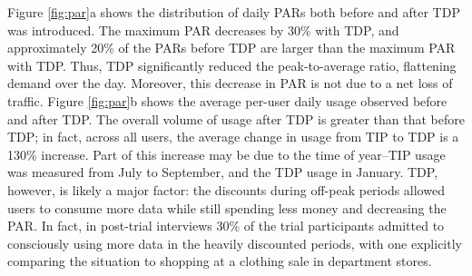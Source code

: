Figure \ref{fig:par}a shows the distribution of daily PARs both before and after TDP was introduced.  The maximum PAR decreases by 30\% with TDP, and approximately 20\% of the PARs before TDP are larger than the maximum PAR with TDP.  Thus, TDP significantly reduced the peak-to-average ratio, flattening demand over the day. Moreover, this decrease in PAR is not due to a net loss of traffic.  Figure \ref{fig:par}b shows the average per-user daily usage observed before and after TDP.  The overall volume of usage after TDP is greater than that before TDP; in fact, across all users, the average change in usage from TIP to TDP is a 130\% increase.  Part of this increase may be due to the time of year--TIP usage was measured from July to September, and the TDP usage in January. TDP, however, is likely a major factor: the discounts during off-peak periods allowed users to consume more data while still spending less money and decreasing the PAR. In fact, in post-trial interviews 30\% of the trial participants admitted to consciously using more data in the heavily discounted periods, with one explicitly comparing the situation to shopping at a clothing sale in department stores.
